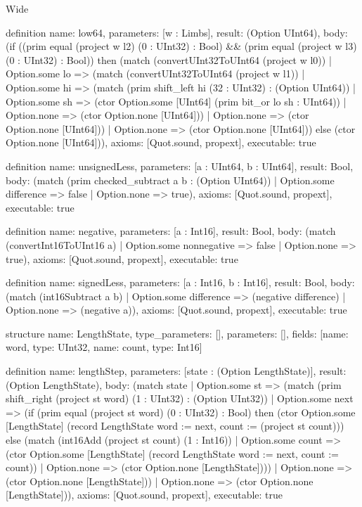 \begin{lexlean}{Wide}
\begin{semanticmodule}
definition{
  name: low64,
  parameters: [w : Limbs],
  result: (Option UInt64),
  body: (if ((prim equal (project w l2) (0 : UInt32) : Bool) && (prim equal (project w l3) (0 : UInt32) : Bool)) then (match (convertUInt32ToUInt64 (project w l0))
    | Option.some lo => (match (convertUInt32ToUInt64 (project w l1))
      | Option.some hi => (match (prim shift_left hi (32 : UInt32) : (Option UInt64))
        | Option.some sh => (ctor Option.some [UInt64] (prim bit_or lo sh : UInt64))
        | Option.none => (ctor Option.none [UInt64]))
      | Option.none => (ctor Option.none [UInt64]))
    | Option.none => (ctor Option.none [UInt64])) else (ctor Option.none [UInt64])),
  axioms: [Quot.sound, propext],
  executable: true
}

definition{
  name: unsignedLess,
  parameters: [a : UInt64, b : UInt64],
  result: Bool,
  body: (match (prim checked_subtract a b : (Option UInt64))
    | Option.some difference => false
    | Option.none => true),
  axioms: [Quot.sound, propext],
  executable: true
}

definition{
  name: negative,
  parameters: [a : Int16],
  result: Bool,
  body: (match (convertInt16ToUInt16 a) | Option.some nonnegative => false | Option.none => true),
  axioms: [Quot.sound, propext],
  executable: true
}

definition{
  name: signedLess,
  parameters: [a : Int16, b : Int16],
  result: Bool,
  body: (match (int16Subtract a b)
    | Option.some difference => (negative difference)
    | Option.none => (negative a)),
  axioms: [Quot.sound, propext],
  executable: true
}

structure{
  name: LengthState,
  type_parameters: [],
  parameters: [],
  fields: [{name: word, type: UInt32}, {name: count, type: Int16}]
}

definition{
  name: lengthStep,
  parameters: [state : (Option LengthState)],
  result: (Option LengthState),
  body: (match state
    | Option.some st => (match (prim shift_right (project st word) (1 : UInt32) : (Option UInt32))
      | Option.some next => (if (prim equal (project st word) (0 : UInt32) : Bool) then (ctor Option.some [LengthState] (record LengthState {word := next, count := (project st count)})) else (match (int16Add (project st count) (1 : Int16))
        | Option.some count => (ctor Option.some [LengthState] (record LengthState {word := next, count := count}))
        | Option.none => (ctor Option.none [LengthState])))
      | Option.none => (ctor Option.none [LengthState]))
    | Option.none => (ctor Option.none [LengthState])),
  axioms: [Quot.sound, propext],
  executable: true
}


\end{semanticmodule}
\end{lexlean}
